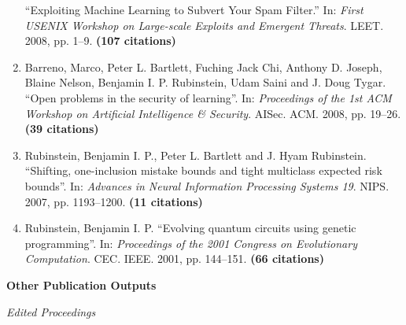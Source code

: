\documentclass[a4paper,12pt]{article}
\begin{document}
\begin{enumerate}
``Exploiting Machine Learning to Subvert Your Spam Filter.''
In: 
\emph{First USENIX Workshop on Large-scale Exploits and Emergent Threats}.
LEET.
2008, pp. 1--9.
 \textbf{(107 citations)}
\item Barreno, Marco, Peter L. Bartlett, Fuching Jack Chi, Anthony D. Joseph, Blaine Nelson, Benjamin I. P. Rubinstein, Udam Saini and J. Doug Tygar.
``Open problems in the security of learning''.
In: 
\emph{Proceedings of the 1st ACM Workshop on Artificial Intelligence \& Security}.
AISec.
ACM.
2008, pp. 19--26.
 \textbf{(39 citations)}
\item Rubinstein, Benjamin I. P., Peter L. Bartlett and J. Hyam Rubinstein.
``Shifting, one-inclusion mistake bounds and tight multiclass expected risk bounds''.
In: 
\emph{Advances in Neural Information Processing Systems 19}.
NIPS.
2007, pp. 1193--1200.
 \textbf{(11 citations)}
\item Rubinstein, Benjamin I. P.
``Evolving quantum circuits using genetic programming''.
In: 
\emph{Proceedings of the 2001 Congress on Evolutionary Computation}.
CEC.
IEEE.
2001, pp. 144--151.
 \textbf{(66 citations)}

\setcounter{list}{\value{enumi}}
\end{enumerate}

\noindent\textbf{Other Publication Outputs}

\noindent\textit{Edited Proceedings}
\end{document}
